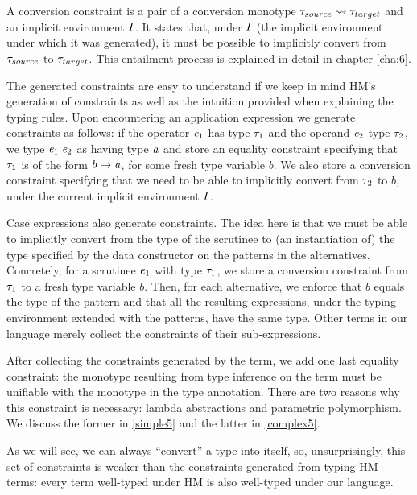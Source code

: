 A conversion constraint is a pair of a conversion monotype $\mathit{\tau}_{source} \rightsquigarrow \mathit{\tau}_{target}$ and an implicit environment $I$. It states that, under $I$ (the implicit environment under which it was generated), it must be possible to implicitly convert from $\mathit{\tau}_{source}$ to $\mathit{\tau}_{target}$. This entailment process is explained in detail in chapter \ref{cha:6}.

The generated constraints are easy to understand if we keep in mind HM's generation of constraints as well as the intuition provided when explaining the typing rules. Upon encountering an application expression we generate constraints as follows: if the operator $\mathit{e}_1$ has type $\mathit{\tau}_1$ and the operand $\mathit{e}_2$ type $\mathit{\tau}_2$, we type $\mathit{e}_1\;\mathit{e}_2$ as having type $\mathit{a}$ and store an equality constraint specifying that $\mathit{\tau}_1$ is of the form $b \to \mathit{a}$, for some fresh type variable $b$. We also store a conversion constraint specifying that we need to be able to implicitly convert from $\mathit{\tau}_2$ to $b$, under the current implicit environment $I$.

Case expressions also generate constraints. The idea here is that we must be able to implicitly convert from the type of the scrutinee to (an instantiation of) the type specified by the data constructor on the patterns in the alternatives. Concretely, for a scrutinee  $\mathit{e}_1$ with type $\mathit{\tau}_1$, we store a conversion constraint from $\mathit{\tau}_1$ to a fresh type variable $b$. Then, for each alternative, we enforce that $b$ equals the type of the pattern and that all the resulting expressions, under the typing environment extended with the patterns, have the same type. Other terms in our language merely collect the constraints of their sub-expressions.

After collecting the constraints generated by the term, we add one last equality constraint: the monotype resulting from type inference on the term must be unifiable with the monotype in the type annotation. There are two reasons why this constraint is necessary: lambda abstractions and parametric polymorphism. We discuss the former in \ref{simple5} and the latter in \ref{complex5}.

As we will see, we can always ``convert'' a type into itself, so, unsurprisingly,  this set of constraints is weaker than the constraints generated from typing HM terms: every term well-typed under HM is also well-typed under our language.


